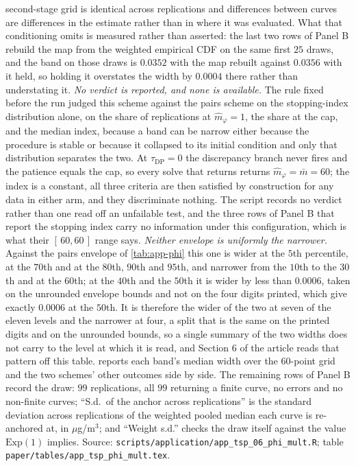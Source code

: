 \documentclass[
  12pt]{article}
\newcommand{\1}[1]{\mathds{1}\left[#1\right]}
\theoremstyle{plain}
\theoremstyle{definition}
\theoremstyle{definition}
\theoremstyle{remark}
\begin{document}
\begin{landscape}
second-stage grid is identical across replications and differences between
curves are differences in the estimate rather than in where it was evaluated.
What that conditioning omits is measured rather than asserted: the last two rows
of Panel B rebuild the map from the weighted empirical CDF on the same first
$25$ draws, and the band on those draws is $0.0352$ with the map rebuilt against
$0.0356$ with it held, so holding it overstates the width by $0.0004$ there
rather than understating it.
\emph{No verdict is reported, and none is available.} The rule fixed before the
run judged this scheme against the pairs scheme on the stopping-index
distribution alone, on the share of replications at $\hat m_\varphi=1$, the share
at the cap, and the median index, because a band can be narrow either because
the procedure is stable or because it collapsed to its initial condition and only
that distribution separates the two. At $\tau_{\mathrm{DP}}=0$ the discrepancy
branch never fires and the patience equals the cap, so every solve that returns
returns $\hat m_\varphi=\bar m=60$; the index is a constant, all three criteria
are then satisfied by construction for any data in either arm, and they
discriminate nothing. The script records no verdict rather than one read off an
unfailable test, and the three rows of Panel B that report the stopping index
carry no information under this configuration, which is what their
$[\,60,60\,]$ range says. \emph{Neither envelope is uniformly the narrower.}
Against the pairs envelope of \cref{tab:app-phi} this one is wider at the
$5$th percentile, at the $70$th and at the $80$th, $90$th and $95$th, and
narrower from the $10$th to the $30$th and at the $60$th; at the $40$th and the
$50$th it is wider by less than $0.0006$, taken on the unrounded envelope bounds
and not on the four digits printed, which give exactly $0.0006$ at the $50$th.
It is therefore the wider of the two at seven of the eleven levels and the
narrower at four, a split that is the same on the printed digits and on the
unrounded bounds, so a single summary of the two widths does not carry to the
level at which it is read, and Section 6 of the article reads that pattern off
this table.
 reports each band's median width over the
$60$-point grid and the two schemes' other outcomes side by side. The remaining
rows of Panel B record the draw: $99$ replications, all $99$ returning a finite
curve, no errors and no non-finite curves; ``S.d.\ of the anchor across
replications'' is the standard deviation across replications of the weighted
pooled median each curve is re-anchored at, in $\mu$g/m$^3$; and ``Weight s.d.''
checks the draw itself against the value $\mathrm{Exp}(1)$ implies. Source:
\texttt{scripts/application/app\_tsp\_06\_phi\_mult.R}; table
\texttt{paper/tables/app\_tsp\_phi\_mult.tex}.
\par\endgroup
\end{landscape}
\end{document}
